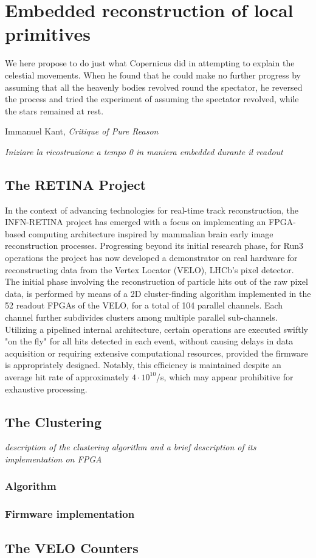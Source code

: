 
\chapter{Embedded reconstruction of local primitives}
\label{chp:retina}
\epigraph{We here propose to do just what Copernicus did in attempting to explain the celestial movements. When he found that he could make no further progress by assuming that all the heavenly bodies revolved round the spectator, he reversed the process and tried the experiment of assuming the spectator revolved, while the stars remained at rest.}{Immanuel Kant, \textit{Critique of Pure Reason}}
\textit{Iniziare la ricostruzione a tempo 0 in maniera embedded durante il readout}

\section{The RETINA Project}
In the context of advancing technologies for real-time track reconstruction, the INFN-RETINA project has emerged with a focus on implementing an FPGA-based computing architecture inspired by  mammalian brain early image reconstruction processes. Progressing beyond its initial research phase, for Run3 operations the project has now developed a demonstrator on real hardware for reconstructing data from the Vertex Locator (VELO), LHCb's pixel detector. The initial phase involving the reconstruction of particle hits out of the raw pixel data, is performed by means of a 2D cluster-finding algorithm implemented in the 52 readout FPGAs of the VELO, for a total of 104 parallel channels. Each channel further subdivides clusters among multiple parallel sub-channels. Utilizing a pipelined internal architecture, certain operations are executed swiftly "on the fly" for all hits detected in each event, without causing delays in data acquisition or requiring extensive computational resources, provided the firmware is appropriately designed. Notably, this efficiency is maintained despite an average hit rate of approximately $4 \cdot 10^{10}$/s, which may appear prohibitive for exhaustive processing.\\

\section{The Clustering}
\textit{description of the clustering algorithm and a brief description of its implementation on FPGA\\
}
\subsection{Algorithm}
\subsection{Firmware implementation}

\section{The VELO Counters}



